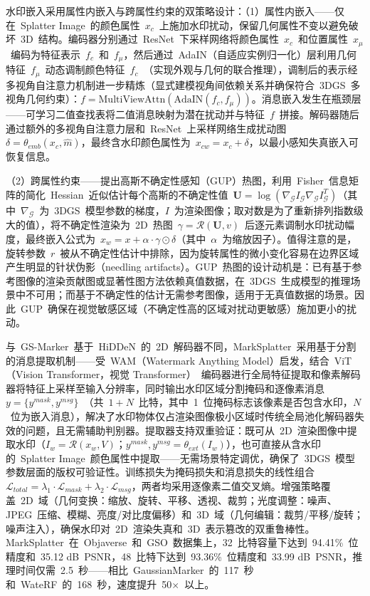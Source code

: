 水印嵌入采用属性内嵌入与跨属性约束的双策略设计：（1）属性内嵌入——仅在~Splatter Image~的颜色属性~$x_c$~上施加水印扰动，保留几何属性不变以避免破坏~3D~结构。编码器分别通过~ResNet~下采样网络将颜色属性~$x_c$~和位置属性~$x_\mu$~编码为特征表示~$f_c$~和~$f_\mu$，然后通过~AdaIN（自适应实例归一化）层利用几何特征~$f_\mu$~动态调制颜色特征~$f_c$~（实现外观与几何的联合推理），调制后的表示经多视角自注意力机制进一步精炼（显式建模视角间依赖关系并确保符合~3DGS~多视角几何约束）：$f = \text{MultiViewAttn}(\text{AdaIN}(f_c, f_\mu))$。消息嵌入发生在瓶颈层——可学习二值查找表将二值消息映射为潜在扰动并与特征~$f$~拼接。解码器随后通过额外的多视角自注意力层和~ResNet~上采样网络生成扰动图~$\delta = \theta_{emb}(x_c, \hat{m})$，最终含水印颜色属性为~$x_{cw} = x_c + \delta$，以最小感知失真嵌入可恢复信息。

（2）跨属性约束——提出高斯不确定性感知（GUP）热图，利用~Fisher~信息矩阵的简化~Hessian~近似估计每个高斯的不确定性值~$\mathbf{U} = \log(\nabla_\mathcal{G} I_\mathcal{G} \nabla_\mathcal{G} I_\mathcal{G}^T)$（其中~$\nabla_\mathcal{G}$~为~3DGS~模型参数的梯度，$I$~为渲染图像；取对数是为了重新排列指数级大的值），将不确定性渲染为~2D~热图~$\gamma = \mathcal{R}(\mathbf{U}, v)$~后逐元素调制水印扰动幅度，最终嵌入公式为~$x_w = x + \alpha \cdot \gamma \odot \delta$（其中~$\alpha$~为缩放因子）。值得注意的是，旋转参数~$r$~被从不确定性估计中排除，因为旋转属性的微小变化容易在边界区域产生明显的针状伪影（needling artifacts）。GUP~热图的设计动机是：已有基于参考图像的渲染贡献图或显著性图方法依赖真值数据，在~3DGS~生成模型的推理场景中不可用；而基于不确定性的估计无需参考图像，适用于无真值数据的场景。因此~GUP~确保在视觉敏感区域（不确定性高的区域对扰动更敏感）施加更小的扰动。

与~GS-Marker~基于~HiDDeN~的~2D~解码器不同，MarkSplatter~采用基于分割的消息提取机制——受~WAM（Watermark Anything Model）启发，结合~ViT（Vision Transformer，视觉 Transformer）~编码器进行全局特征提取和像素解码器将特征上采样至输入分辨率，同时输出水印区域分割掩码和逐像素消息~$y = \{y^{mask}, y^{msg}\}$~（共~$1+N$~比特，其中~1~位掩码标志该像素是否包含水印，$N$~位为嵌入消息），解决了水印物体仅占渲染图像极小区域时传统全局池化解码器失效的问题，且无需辅助判别器。提取器支持双重验证：既可从~2D~渲染图像中提取水印（$I_w = \mathcal{R}(x_w, V)$；$y^{mask}, y^{msg} = \theta_{ext}(I_w)$），也可直接从含水印的~Splatter Image~颜色属性中提取——无需场景特定调优，确保了~3DGS~模型参数层面的版权可验证性。训练损失为掩码损失和消息损失的线性组合~$\mathcal{L}_{total} = \lambda_1 \cdot \mathcal{L}_{mask} + \lambda_2 \cdot \mathcal{L}_{msg}$，两者均采用逐像素二值交叉熵。增强策略覆盖~2D~域（几何变换：缩放、旋转、平移、透视、裁剪；光度调整：噪声、JPEG~压缩、模糊、亮度/对比度偏移）和~3D~域（几何编辑：裁剪/平移/旋转；噪声注入），确保水印对~2D~渲染失真和~3D~表示篡改的双重鲁棒性。MarkSplatter~在~Objaverse~和~GSO~数据集上，32~比特容量下达到~94.41\%~位精度和~35.12 dB~PSNR，48~比特下达到~93.36\%~位精度和~33.99 dB~PSNR，推理时间仅需~2.5~秒——相比~GaussianMarker~的~117~秒和~WateRF~的~168~秒，速度提升~50$\times$~以上。

